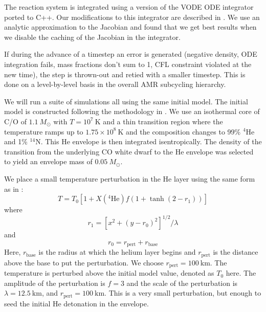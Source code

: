 \documentclass[linenumbers,trackchanges]{aastex631}
\newcommand{\isot}[2]{$^{#2}\mathrm{#1}$}
\newcommand{\isotm}[2]{{}^{#2}\mathrm{#1}}
\begin{document}
The reaction system is integrated using a version of the VODE ODE integrator
\citep{vode} ported to C++.  Our modifications to this integrator are described
in \citet{castro_simple_sdc}.  We use an analytic approximation to the Jacobian
and found that we get best results when we disable the caching of the Jacobian
in the integrator.

If during the advance of a timestep an error is generated (negative
density, ODE integration fails, mass fractions don't sum to 1, CFL constraint violated at the new time), the
step is thrown-out and retied with a smaller timestep.  This is done
on a level-by-level basis in the overall AMR subcycling hierarchy.

We will run a suite of simulations all using the same initial model.
The initial model is constructed following the methodology in
\citet{subchandra}.  We use an isothermal core of C/O of $1.1~M_\odot$
with $T = 10^7~\mathrm{K}$ and a thin transition region where the
temperature ramps up to $1.75\times 10^8~\mathrm{K}$ and the
composition changes to 99\% \isot{He}{4} and 1\% \isot{N}{14}.    This He envelope is then integrated isentropically.  The
density of the transition from the underlying CO white dwarf to the He
envelope was selected to yield an envelope mass of $0.05~M_\odot$.

We place a small temperature perturbation in the He layer using the
same form as in \citet{castro_simple_sdc}:
\begin{equation}
  T = T_0 \left [ 1 + X(\isotm{He}{4}) f (1 + \tanh(2 - r_1)) \right ]
\end{equation}
where
\begin{equation}
  r_1 = \left [ x^2 + (y - r_0)^2 \right ]^{1/2} / \lambda
\end{equation}
and
\begin{equation}
  r_0 = r_\mathrm{pert} + r_\mathrm{base}
\end{equation}
Here, $r_\mathrm{base}$ is the radius at which the helium layer begins
and $r_\mathrm{pert}$ is the distance above the base to put the
perturbation.  We choose $r_\mathrm{pert} = 100~\mathrm{km}$.  The
temperature is perturbed above the initial model value, denoted as
$T_0$ here.  The amplitude of the perturbation is $f = 3$ and the
scale of the perturbation is $\lambda = 12.5~\mathrm{km}$, and
$r_\mathrm{pert} = 100~\mathrm{km}$.  This is a very small
perturbation, but enough to seed the initial He detonation in the
envelope.
\end{document}
